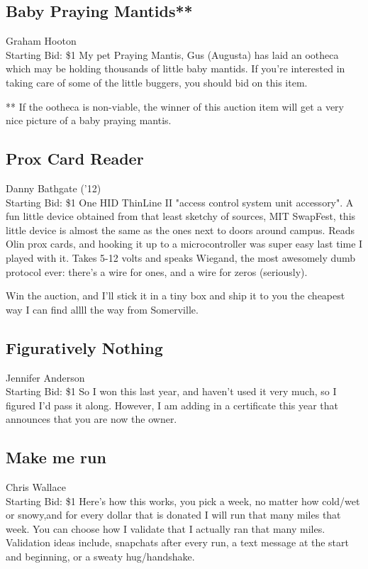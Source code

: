 \documentclass[11pt]{article}
\begin{document}
\subsection{Baby Praying Mantids**}
Graham Hooton
\\
Starting Bid: \$1
\newline
My pet Praying Mantis, Gus (Augusta) has laid an ootheca which may be holding thousands of little baby mantids. If you're interested in taking care of some of the little buggers, you should bid on this item. 


** If the ootheca is non-viable, the winner of this auction item will get a very nice picture of a baby praying mantis.
\subsection{Prox Card Reader}
Danny Bathgate ('12)
\\
Starting Bid: \$1
\newline
One HID ThinLine II "access control system unit accessory". A fun little device obtained from that least sketchy of sources, MIT SwapFest, this little device is almost the same as the ones next to doors around campus. Reads Olin prox cards, and hooking it up to a microcontroller was super easy last time I played with it. Takes 5-12 volts and speaks Wiegand, the most awesomely dumb protocol ever: there's a wire for ones, and a wire for zeros (seriously).

Win the auction, and I'll stick it in a tiny box and ship it to you the cheapest way I can find allll the way from Somerville.
\subsection{Figuratively Nothing}
Jennifer Anderson
\\
Starting Bid: \$1
\newline
So I won this last year, and haven't used it very much, so I figured I'd pass it along. However, I am adding in a certificate this year that announces that you are now the owner.
\subsection{Make me run}
Chris Wallace
\\
Starting Bid: \$1
\newline
Here's how this works, you pick a week, no matter how cold/wet or snowy,and for every dollar that is donated I will run that many miles that week. You can choose how I validate that I actually ran that many miles. Validation ideas include, snapchats after every run, a text message at the start and beginning, or a sweaty hug/handshake.
\end{document}
